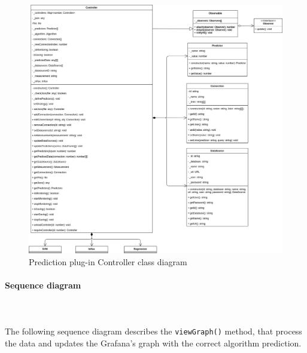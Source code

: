 \begin{figure}[H]
\centering
\includegraphics[scale=0.40]{../../../Diagrams/Classes_diagrams/plugin_controller.png}
\caption{Prediction plug-in Controller class diagram}
\end{figure}

\paragraph*{Sequence diagram}\mbox{} \\ \mbox{} \\
The following sequence diagram describes the \texttt{viewGraph()} method, that 
process the data and updates the Grafana's graph with the correct algorithm prediction.

